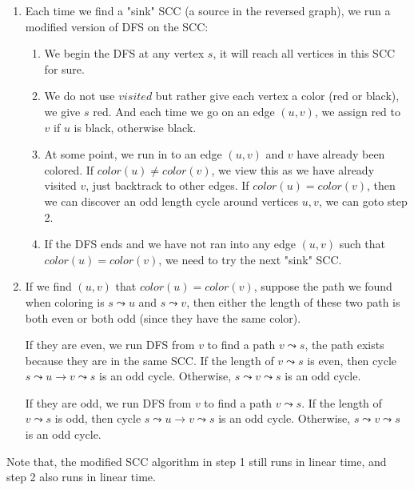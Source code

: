 \documentclass[twoside]{homework}
\begin{document}
\begin{enumerate}
	\item Each time we find a "sink" SCC (a source in the reversed graph), we run a modified version of DFS on the SCC:
		\begin{enumerate}
			\item We begin the DFS at any vertex $s$, it will reach all vertices in this SCC for sure.
			\item We do not use $visited$ but rather give each vertex a color (red or black), we give $s$ red. And each time we go on an edge $(u, v)$, we assign red to $v$ if $u$ is black, otherwise black.
			\item At some point, we run in to an edge $(u, v)$ and $v$ have already been colored. If $color(u) \neq color(v)$, we view this as we have already visited $v$, just backtrack to other edges. If $color(u) = color(v)$, then we can discover an odd length cycle around vertices $u, v$, we can goto step 2.
			\item If the DFS ends and we have not ran into any edge $(u, v)$ such that $color(u) = color(v)$, we need to try the next "sink" SCC.
		\end{enumerate}
	\item If we find $(u, v)$ that $color(u) = color(v)$, suppose the path we found when coloring is $s \leadsto u$ and $s \leadsto v$, then either the length of these two path is both even or both odd (since they have the same color).

	If they are even, we run DFS from $v$ to find a path $v \leadsto s$, the path exists because they are in the same SCC. If the length of $v \leadsto s$ is even, then cycle $s \leadsto u \rightarrow v \leadsto s$ is an odd cycle. Otherwise, $s\leadsto v \leadsto s$ is an odd cycle.

	If they are odd, we run DFS from $v$ to find a path $v \leadsto s$. If the length of $v \leadsto s$ is odd, then cycle $s \leadsto u \rightarrow v \leadsto s$ is an odd cycle. Otherwise, $s\leadsto v \leadsto s$ is an odd cycle.
\end{enumerate}

Note that, the modified SCC algorithm in step 1 still runs in linear time, and step 2 also runs in linear time.
\end{document}

